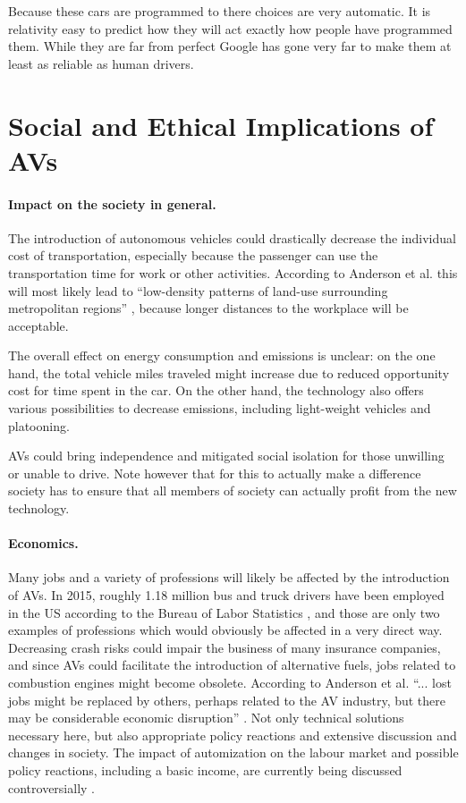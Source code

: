 \documentclass[11pt]{article}
\begin{document}
Because these cars are programmed to there choices are very automatic. It is relativity easy to predict how they will act
exactly how people have programmed them. While they are far from perfect Google has gone very far to make them at least as
reliable as human drivers. 

\section{Social and Ethical Implications of AVs}
\paragraph{Impact on the society in general.}
The introduction of autonomous vehicles could drastically decrease the individual cost of transportation, especially because the passenger can use the transportation time for work or other activities. According to Anderson et al. this will most likely lead to ``low-density patterns of land-use surrounding metropolitan regions'' \cite{Anderson2014rand}, because longer distances to the workplace will be acceptable.

The overall effect on energy consumption and emissions is unclear: on the one hand, the total vehicle miles traveled might increase due to reduced opportunity cost for time spent in the car. On the other hand, the technology also offers various possibilities to decrease emissions, including light-weight vehicles and platooning.

AVs could bring independence and mitigated social isolation for those unwilling or unable to drive. Note however that for this to actually make a difference society has to ensure that all members of society can actually profit from the new technology.

\paragraph{Economics.}
Many jobs and a variety of professions will likely be affected by the introduction of AVs. In 2015, roughly 1.18 million bus and truck drivers have been employed in the US according to the Bureau of Labor Statistics \cite{USLabourBureau2016}, and those are only two examples of professions which would obviously be affected in a very direct way. Decreasing crash risks could impair the business of many insurance companies, and since AVs could facilitate the introduction of alternative fuels, jobs related to combustion engines might become obsolete. According to Anderson et al. ``... lost jobs might be replaced by others, perhaps related to the AV industry, but there may be considerable economic disruption'' \cite[p. 40ff]{Anderson2014rand}. Not only technical solutions necessary here, but also appropriate policy reactions and extensive discussion and changes in society. The impact of automization on the labour market and possible policy reactions, including a basic income, are currently being discussed controversially \cite{VanDerVeen2002, Olsen2014}.
\end{document}
